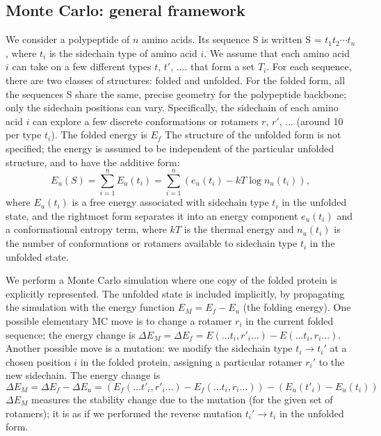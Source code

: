 \subsection{Monte Carlo: general framework}
We consider a polypeptide of $n$ amino acids.
Its sequence S is written  S = $t_1 t_2 \cdots t_n$, where $t_i$ is
the sidechain type of amino acid $i$.
We assume that each amino acid $i$ can take on a few different types $t$,
$t'$, .... that form a set $T_i$.
For each sequence, there are two classes of structures: folded and unfolded.
For the folded form, all the sequences S share the same, precise geometry for the polypeptide backbone; only the
sidechain positions can vary.
Specifically, the sidechain of each amino acid $i$ can explore a few discrete
conformations or rotamers $r$, $r'$, ... (around 10 per type $t_i$). The folded energy is $E_f$
The structure of the unfolded form is not specified; the energy is assumed to be independent of the particular unfolded structure, and to have the additive form:
\begin{equation}  \label{eq:unfolded}
E_u(S) = \sum_{i=1}^n E_u(t_i) = \sum_{i=1}^n \left( e_u(t_i) - kT \log n_u(t_i) \right),
\end{equation}
where $E_u(t_i)$ is a free energy associated with sidechain type $t_i$ in the unfolded state, and the rightmost form
separates it into an energy component $e_u(t_i)$ and a conformational entropy term, where $kT$ is the thermal energy
and $n_u(t_i)$ is the number of conformations or rotamers available to sidechain type $t_i$ in the unfolded state.

We perform a Monte Carlo simulation \cite{Metropolis53,FrenkelBK} where one copy of the folded protein
is explicitly represented.
The unfolded state is included implicitly, by propagating the simulation with the energy
function $E_M = E_f - E_u$ (the folding energy).
One possible elementary MC move is to change a rotamer $r_i$ in the
current folded sequence; the energy change is $\Delta E_M = \Delta E_f = E(... t_i,r'_i ...) - E(... t_i,r_i ...)$.
Another possible move is a mutation: we modify the sidechain type $t_i \rightarrow t_i'$ at a chosen position $i$
in the folded protein, assigning a particular rotamer $r_i'$ to the new sidechain.
The energy change is
\begin{equation}  \label{eq:deltaE}
\Delta E_M = \Delta E_f - \Delta E_u =
\left( E_f(... t'_i,r'_i ...) - E_f(... t_i,r_i ...) \right) - \left( E_u(t'_i) - E_u(t_i) \right) 
\end{equation}
$\Delta E_M$ measures the stability change due to the mutation (for the given set of rotamers); it is as if we
performed the reverse mutation $t_i' \rightarrow t_i$ in the unfolded form. 

